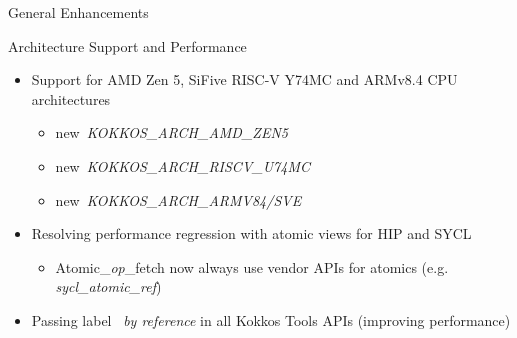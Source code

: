 
\begin{frame}[fragile]

  {\Huge General Enhancements}

  \vspace{10pt}

\end{frame}




\begin{frame}[fragile]{Architecture Support and Performance}
 \begin{itemize}
     \item Support for AMD Zen 5, SiFive RISC-V Y74MC and ARMv8.4 CPU architectures
     \begin{itemize}
       \item new~\emph{KOKKOS\_ARCH\_AMD\_ZEN5} 
       \item new~\emph{KOKKOS\_ARCH\_RISCV\_U74MC}
       \item new~\emph{KOKKOS\_ARCH\_ARMV84/SVE}
     \end{itemize}
     \item {Resolving performance regression with atomic views for HIP and SYCL}
     \begin{itemize}
       \item Atomic\_\emph{op}\_fetch now always use vendor APIs for atomics (e.g. \emph{sycl\_atomic\_ref})
     \end{itemize}
     \item Passing label ~\emph{by reference} in all Kokkos Tools APIs (improving performance)
 \end{itemize}
\end{frame}

